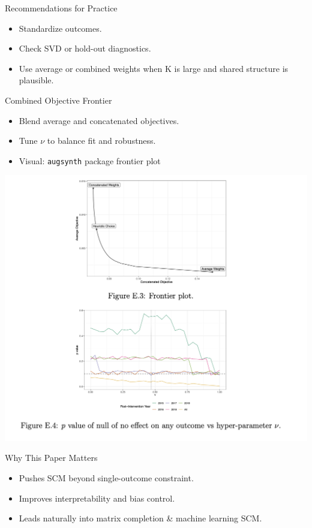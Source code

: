 \documentclass{beamer}
\begin{document}
\begin{frame}{Recommendations for Practice}
  \begin{itemize}
    \item Standardize outcomes.
    \item Check SVD or hold-out diagnostics.
    \item Use average or combined weights when K is large and shared structure is plausible.
  \end{itemize}
\end{frame}

\begin{frame}{Combined Objective Frontier}
  \begin{itemize}
    \item Blend average and concatenated objectives.
    \item Tune $\nu$ to balance fit and robustness.
    \item Visual: \texttt{augsynth} package frontier plot
  \end{itemize}
  \includegraphics[width=0.85\linewidth]{./lecture_includes/frontier_plot.png}
\end{frame}

\begin{frame}{Why This Paper Matters}
  \begin{itemize}
    \item Pushes SCM beyond single-outcome constraint.
    \item Improves interpretability and bias control.
    \item Leads naturally into matrix completion \& machine learning SCM.
  \end{itemize}
\end{frame}
\end{document}
